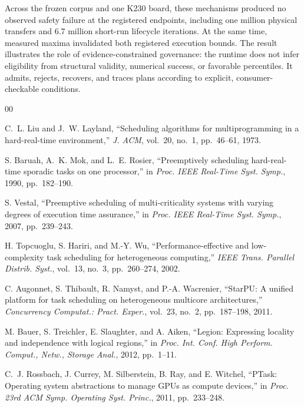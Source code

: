 \documentclass[lettersize,journal]{IEEEtran}
\begin{document}
Across the frozen corpus and one K230 board, these mechanisms produced no
observed safety failure at the registered endpoints, including one million
physical transfers and 6.7 million short-run lifecycle iterations. At the same
time, measured maxima invalidated both registered execution bounds. The result
illustrates the role of evidence-constrained governance: the runtime does not
infer eligibility from structural validity, numerical success, or favorable
percentiles. It admits, rejects, recovers, and traces plans according to
explicit, consumer-checkable conditions.

\clearpage
\begin{thebibliography}{00}

C.~L. Liu and J.~W. Layland, ``Scheduling algorithms for multiprogramming in
a hard-real-time environment,'' \emph{J. ACM}, vol.~20, no.~1, pp.~46--61,
1973.

S. Baruah, A.~K. Mok, and L.~E. Rosier, ``Preemptively scheduling
hard-real-time sporadic tasks on one processor,'' in \emph{Proc. IEEE Real-Time
Syst. Symp.}, 1990, pp.~182--190.

S. Vestal, ``Preemptive scheduling of multi-criticality systems with varying
degrees of execution time assurance,'' in \emph{Proc. IEEE Real-Time Syst.
Symp.}, 2007, pp.~239--243.

H. Topcuoglu, S. Hariri, and M.-Y. Wu, ``Performance-effective and
low-complexity task scheduling for heterogeneous computing,'' \emph{IEEE
Trans. Parallel Distrib. Syst.}, vol.~13, no.~3, pp.~260--274, 2002.

C. Augonnet, S. Thibault, R. Namyst, and P.-A. Wacrenier, ``StarPU: A unified
platform for task scheduling on heterogeneous multicore architectures,''
\emph{Concurrency Computat.: Pract. Exper.}, vol.~23, no.~2, pp.~187--198,
2011.

M. Bauer, S. Treichler, E. Slaughter, and A. Aiken, ``Legion: Expressing
locality and independence with logical regions,'' in \emph{Proc. Int. Conf.
High Perform. Comput., Netw., Storage Anal.}, 2012, pp.~1--11.

C.~J. Rossbach, J. Currey, M. Silberstein, B. Ray, and E. Witchel, ``PTask:
Operating system abstractions to manage GPUs as compute devices,'' in
\emph{Proc. 23rd ACM Symp. Operating Syst. Princ.}, 2011, pp.~233--248.


\end{thebibliography}
\end{document}
